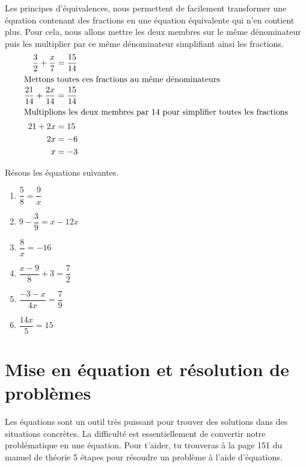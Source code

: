 \documentclass[../math2.tex]{subfiles}
\begin{document}
Les principes d'équivalences, nous permettent de facilement transformer une équation contenant des fractions en une équation équivalente qui n'en contient plus. Pour cela, nous allons mettre les deux membres sur le même dénominateur puis les multiplier par ce même dénominateur simplifiant ainsi les fractions.
\begin{align*}
  \dfrac{3}{2} + \dfrac{x}{7} &= \dfrac{15}{14}\\
  \intertext{Mettons toutes ces fractions au même dénominateurs}
  \dfrac{21}{14} + \dfrac{2x}{14} &= \dfrac{15}{14}\\
  \intertext{Multiplions les deux membres par 14 pour simplifier toutes les fractions}
  21 + 2x &= 15\\
  2x &= -6\\
  x &= -3
\end{align*}
\newpage
\begin{exercise}
  Résous les équations suivantes.
  \begin{enumerate}[cols=2, itemsep=6cm]
    \item $\dfrac{5}{8} = \dfrac{9}{x}$
    \item $9 - \dfrac{3}{9} = x - 12x$
    \item $\dfrac{8}{x} = - 16$
    \item $\dfrac{x - 9}{8} + 3 = \dfrac{7}{2}$
    \item $\dfrac{- 3 - x}{4x} = \dfrac{7}{9}$
    \item $\dfrac{14x}{5} = 15$
  \end{enumerate}
  \vspace*{6cm}
\end{exercise}

\newpage
\section{Mise en équation et résolution de problèmes}
Les équations sont un outil très puissant pour trouver des solutions dans des situations concrètes. La difficulté est essentiellement de convertir notre problématique en une équation. Pour t'aider, tu trouveras à la page 151 du manuel de théorie 5 étapes pour résoudre un problème à l'aide d'équations.
\end{document}
